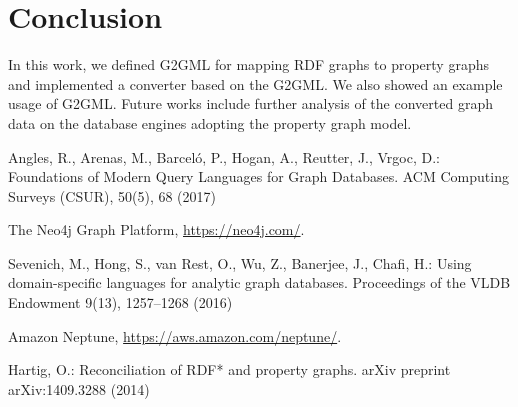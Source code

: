 \documentclass[runningheads]{llncs}
\begin{document}
\section{Conclusion}
In this work, we defined G2GML for mapping RDF graphs to property graphs and implemented a converter based on the G2GML. We also showed an example usage of G2GML. Future works include further analysis of the converted graph data on the database engines adopting the property graph model.


%
%
%
% 
% 
%
\begin{thebibliography}{8}

Angles, R., Arenas, M., Barceló, P., Hogan, A., Reutter, J., Vrgoc, D.: Foundations of Modern Query Languages for Graph Databases. ACM Computing Surveys (CSUR), 50(5), 68 (2017)

The Neo4j Graph Platform, \url{https://neo4j.com/}.

Sevenich, M., Hong, S., van Rest, O., Wu, Z., Banerjee, J., Chafi, H.: Using domain-specific languages for analytic graph databases. Proceedings of the VLDB Endowment 9(13), 1257--1268 (2016)

Amazon Neptune, \url{https://aws.amazon.com/neptune/}.

Hartig, O.: Reconciliation of RDF* and property graphs. arXiv preprint arXiv:1409.3288 (2014)





\end{thebibliography}
\end{document}
